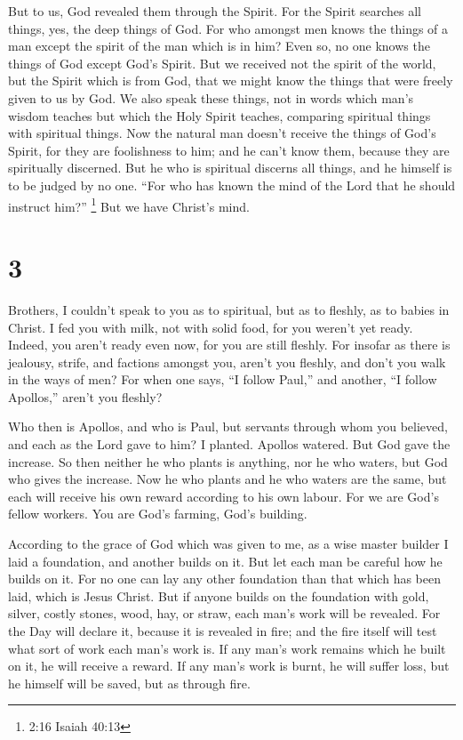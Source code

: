  But to us, God revealed them through the Spirit. For the
Spirit searches all things, yes, the deep things of God. 
For who amongst men knows the things of a man except the spirit of the
man which is in him? Even so, no one knows the things of God except
God's Spirit.  But we received not the spirit of the world,
but the Spirit which is from God, that we might know the things that
were freely given to us by God.  We also speak these
things, not in words which man's wisdom teaches but which the Holy
Spirit teaches, comparing spiritual things with spiritual things.
 Now the natural man doesn't receive the things of God's
Spirit, for they are foolishness to him; and he can't know them, because
they are spiritually discerned.  But he who is spiritual
discerns all things, and he himself is to be judged by no one.
 ``For who has known the mind of the Lord that he should
instruct him?'' \footnote{2:16 Isaiah 40:13} But we have Christ's mind.

\hypertarget{section-2}{%
\section{3}\label{section-2}}

 Brothers, I couldn't speak to you as to spiritual, but as
to fleshly, as to babies in Christ.  I fed you with milk,
not with solid food, for you weren't yet ready. Indeed, you aren't ready
even now,  for you are still fleshly. For insofar as there
is jealousy, strife, and factions amongst you, aren't you fleshly, and
don't you walk in the ways of men?  For when one says, ``I
follow Paul,'' and another, ``I follow Apollos,'' aren't you fleshly?

 Who then is Apollos, and who is Paul, but servants through
whom you believed, and each as the Lord gave to him?  I
planted. Apollos watered. But God gave the increase.  So
then neither he who plants is anything, nor he who waters, but God who
gives the increase.  Now he who plants and he who waters are
the same, but each will receive his own reward according to his own
labour.  For we are God's fellow workers. You are God's
farming, God's building.

 According to the grace of God which was given to me, as a
wise master builder I laid a foundation, and another builds on it. But
let each man be careful how he builds on it.  For no one
can lay any other foundation than that which has been laid, which is
Jesus Christ.  But if anyone builds on the foundation with
gold, silver, costly stones, wood, hay, or straw,  each
man's work will be revealed. For the Day will declare it, because it is
revealed in fire; and the fire itself will test what sort of work each
man's work is.  If any man's work remains which he built on
it, he will receive a reward.  If any man's work is burnt,
he will suffer loss, but he himself will be saved, but as through fire.

